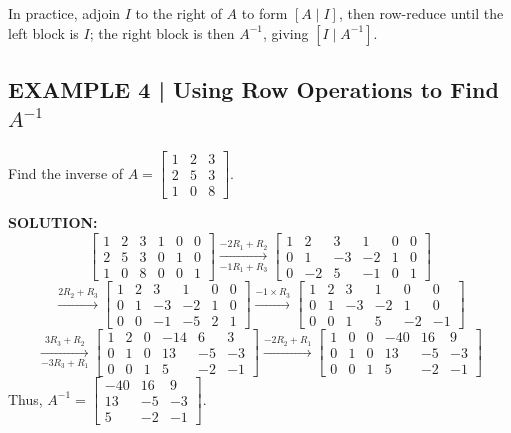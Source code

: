 \documentclass{article}
\theoremstyle{mystyle}
\begin{document}
In practice, adjoin $I$ to the right of $A$ to form $[A\mid I]$, then row-reduce until the left block is $I$; the right block is then $A^{-1}$, giving $[I\mid A^{-1}]$.

\subsection*{EXAMPLE 4 | Using Row Operations to Find $A^{-1}$}
Find the inverse of $A=\begin{bmatrix}1&2&3\\2&5&3\\1&0&8\end{bmatrix}$.

\textbf{SOLUTION:}
\[
\left[\begin{array}{ccc|ccc}1&2&3&1&0&0\\2&5&3&0&1&0\\1&0&8&0&0&1\end{array}\right]
\xrightarrow[-1R_1+R_3]{-2R_1+R_2}
\left[\begin{array}{ccc|ccc}1&2&3&1&0&0\\0&1&-3&-2&1&0\\0&-2&5&-1&0&1\end{array}\right]
\]
\[
\xrightarrow{2R_2+R_3}
\left[\begin{array}{ccc|ccc}1&2&3&1&0&0\\0&1&-3&-2&1&0\\0&0&-1&-5&2&1\end{array}\right]
\xrightarrow{-1\times R_3}
\left[\begin{array}{ccc|ccc}1&2&3&1&0&0\\0&1&-3&-2&1&0\\0&0&1&5&-2&-1\end{array}\right]
\]
\[
\xrightarrow[-3R_3+R_1]{3R_3+R_2}
\left[\begin{array}{ccc|ccc}1&2&0&-14&6&3\\0&1&0&13&-5&-3\\0&0&1&5&-2&-1\end{array}\right]
\xrightarrow{-2R_2+R_1}
\left[\begin{array}{ccc|ccc}1&0&0&-40&16&9\\0&1&0&13&-5&-3\\0&0&1&5&-2&-1\end{array}\right]
\]
Thus, $A^{-1}=\begin{bmatrix}-40&16&9\\13&-5&-3\\5&-2&-1\end{bmatrix}$.
\end{document}
